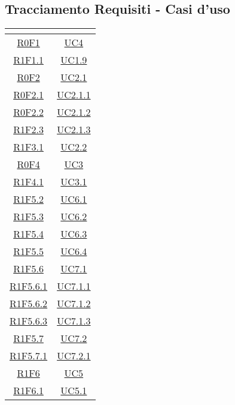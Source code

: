 \subsection{Tracciamento Requisiti - Casi d'uso}
\normalsize
\renewcommand{\arraystretch}{1.5}
\begin{longtable}{|c|c|}
	\hline
	\rowcolor{title_row}
\textbf{\color{title_text}{Codice Requisiti}} & \textbf{\color{title_text}{Codice Casi d'uso}} \\
\hline
\endhead
\hyperlink{R0F1}{R0F1} & \hyperlink{UC4}{UC4}\\
\hline
\hyperlink{R1F1.1}{R1F1.1} & \hyperlink{UC1.9}{UC1.9}\\
\hline
\hyperlink{R0F2}{R0F2} & \hyperlink{UC2.1}{UC2.1}\\
\hline
\hyperlink{R0F2.1}{R0F2.1} & \hyperlink{UC2.1.1}{UC2.1.1}\\
\hline
\hyperlink{R0F2.2}{R0F2.2} & \hyperlink{UC2.1.2}{UC2.1.2}\\
\hline
\hyperlink{R1F2.3}{R1F2.3} & \hyperlink{UC2.1.3}{UC2.1.3}\\
\hline
\hyperlink{R1F3.1}{R1F3.1} & \hyperlink{UC2.2}{UC2.2}\\
\hline
\hyperlink{R0F4}{R0F4} & \hyperlink{UC3}{UC3}\\
\hline
\hyperlink{R1F4.1}{R1F4.1} & \hyperlink{UC3.1}{UC3.1}\\
\hline
\hyperlink{R1F5.2}{R1F5.2} & \hyperlink{UC6.1}{UC6.1}\\
\hline
\hyperlink{R1F5.3}{R1F5.3} & \hyperlink{UC6.2}{UC6.2}\\
\hline
\hyperlink{R1F5.4}{R1F5.4} & \hyperlink{UC6.3}{UC6.3}\\
\hline
\hyperlink{R1F5.5}{R1F5.5} & \hyperlink{UC6.4}{UC6.4}\\
\hline
\hyperlink{R1F5.6}{R1F5.6} & \hyperlink{UC7.1}{UC7.1}\\
\hline
\hyperlink{R1F5.6.1}{R1F5.6.1} & \hyperlink{UC7.1.1}{UC7.1.1}\\
\hline
\hyperlink{R1F5.6.2}{R1F5.6.2} & \hyperlink{UC7.1.2}{UC7.1.2}\\
\hline
\hyperlink{R1F5.6.3}{R1F5.6.3} & \hyperlink{UC7.1.3}{UC7.1.3}\\
\hline
\hyperlink{R1F5.7}{R1F5.7} & \hyperlink{UC7.2}{UC7.2}\\
\hline
\hyperlink{R1F5.7.1}{R1F5.7.1} & \hyperlink{UC7.2.1}{UC7.2.1}\\
\hline
\hyperlink{R1F6}{R1F6} & \hyperlink{UC5}{UC5}\\
\hline
\hyperlink{R1F6.1}{R1F6.1} & \hyperlink{UC5.1}{UC5.1}\\

\end{longtable}
